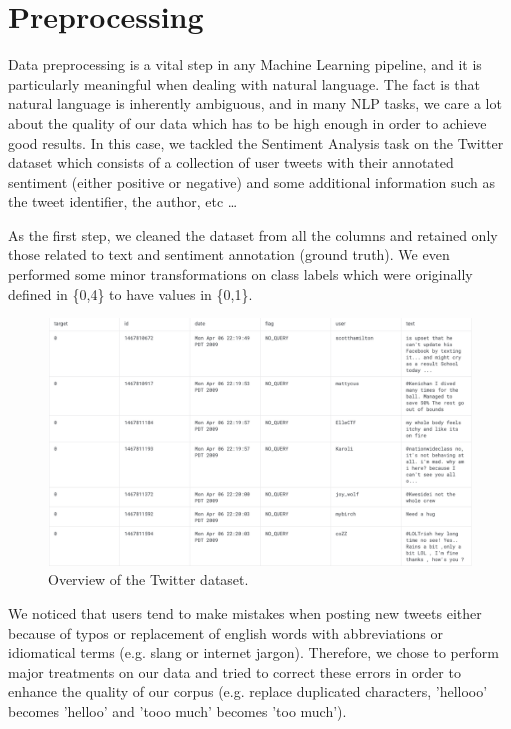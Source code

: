 \section*{Preprocessing}

Data preprocessing is a vital step in any Machine Learning pipeline, and it is particularly meaningful when dealing with natural language.
The fact is that natural language is inherently ambiguous, and in many NLP tasks, we care a lot about the quality of our data which has to be high enough in order to achieve good results.
In this case, we tackled the Sentiment Analysis task on the Twitter dataset which consists of a collection of user tweets with their annotated sentiment (either positive or negative) and some additional information such as the tweet identifier, the author, etc \dots

As the first step, we cleaned the dataset from all the columns and retained only those related to text and sentiment annotation (ground truth). We even performed some minor transformations on class labels which were originally defined in \{0,4\} to have values in \{0,1\}.

\begin{figure}[h!t]
    \centering
    \includegraphics[scale=0.32]{twitter_overview.png}
    \caption{Overview of the Twitter dataset.}
    \label{fig:TWITTER_OVERVIEW}
\end{figure}

We noticed that users tend to make mistakes when posting new tweets either because of typos or replacement of english words with abbreviations or idiomatical terms (e.g. slang or internet jargon).
Therefore, we chose to perform major treatments on our data and tried to correct these errors in order to enhance the quality of our corpus (e.g. replace duplicated characters, 'hellooo' becomes 'helloo' and 'tooo much' becomes 'too much').

